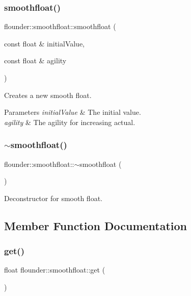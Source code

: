 \subsubsection{\texorpdfstring{smoothfloat()}{smoothfloat()}}
{\footnotesize\ttfamily flounder\+::smoothfloat\+::smoothfloat (\begin{DoxyParamCaption}\item[{const float \&}]{initial\+Value,  }\item[{const float \&}]{agility }\end{DoxyParamCaption})}



Creates a new smooth float. 


\begin{DoxyParams}{Parameters}
{\em initial\+Value} & The initial value. \\
\hline
{\em agility} & The agility for increasing actual. \\
\hline
\end{DoxyParams}
\mbox{\label{classflounder_1_1smoothfloat_a4d96e3fdb93fbbf9d28c788a1b7a4e58}} 
\subsubsection{\texorpdfstring{$\sim$smoothfloat()}{~smoothfloat()}}
{\footnotesize\ttfamily flounder\+::smoothfloat\+::$\sim$smoothfloat (\begin{DoxyParamCaption}{ }\end{DoxyParamCaption})}



Deconstructor for smooth float. 



\subsection{Member Function Documentation}
\mbox{\label{classflounder_1_1smoothfloat_a69103986400ad1181e516ba37c73804e}} 
\subsubsection{\texorpdfstring{get()}{get()}}
{\footnotesize\ttfamily float flounder\+::smoothfloat\+::get (\begin{DoxyParamCaption}{ }\end{DoxyParamCaption})\hspace{0.3cm}{\ttfamily [inline]}}



